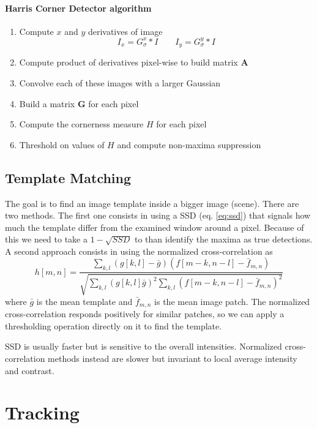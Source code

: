 \documentclass[a4paper,twocolumn]{article}
\begin{document}
\paragraph{Harris Corner Detector algorithm}
\begin{enumerate}
	\item Compute $x$ and $y$ derivatives of image
		$$I_x=G_{\sigma}^x * I \qquad I_y = G_{\sigma}^y * I$$
	\item Compute product of derivatives pixel-wise to build matrix $\mathbf{A}$
	\item Convolve each of these images with a larger Gaussian
	\item Build a matrix $\mathbf{G}$ for each pixel
	\item Compute the cornerness measure $H$ for each pixel
	\item Threshold on values of $H$ and compute non-maxima suppression
\end{enumerate}


\subsection{Template Matching}
The goal is to find an image template inside a bigger image (scene). There are
two methods. The first one consists in using a SSD (eq. \ref{eq:ssd}) that signals how much the
template differ from the examined window around a pixel. Because of this we need
to take a $1 - \sqrt{SSD}$ to than identify the maxima as true detections.
A second approach consists in using the normalized cross-correlation as
\begin{equation}
	h[m,n]=\frac{\sum_{k,l}(g[k,l]-\bar{g})(f[m-k,n-l]-\bar{f}_{m,n})}
		{\sqrt{\sum_{k,l}(g[k,l]\bar{g})^2\sum_{k,l}(f[m-k,n-l]-\bar{f}_{m,n})^2}}
\end{equation}
where $\bar{g}$ is the mean template and $\bar{f}_{m,n}$ is the mean image patch.
The normalized cross-correlation responds positively for similar patches, so we
can apply a thresholding operation directly on it to find the template.

SSD is usually faster but is sensitive to the overall intensities. Normalized
cross-correlation methods instead are slower but invariant to local average
intensity and contrast.



\section{Tracking}
\end{document}
